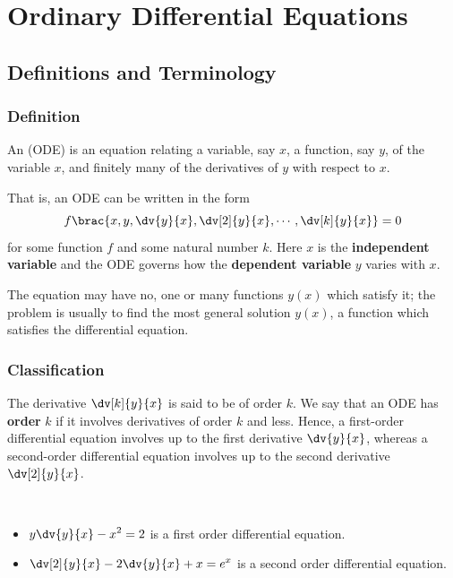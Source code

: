 

\chapter{Ordinary Differential Equations}

\section{Definitions and Terminology}
\subsection{Definition}
\begin{definition}
An  (ODE) is an equation relating a variable, say $x$, a function, say $y$, of the variable $x$, and finitely many of the derivatives of $y$ with respect to $x$.

That is, an ODE can be written in the form
\[ f\brac{x,y,\dv{y}{x},\dv[2]{y}{x},\cdots,\dv[k]{y}{x}} = 0 \]
for some function $f$ and some natural number $k$. Here $x$ is the \textbf{independent variable} and the ODE governs how the \textbf{dependent variable} $y$ varies with $x$. 
\end{definition}

\begin{remark}
The equation may have no, one or many functions $y(x)$ which satisfy it; the problem is usually to find the most general solution $y(x)$, a function which satisfies the differential equation.
\end{remark}

\subsection{Classification}
The derivative $\dv[k]{y}{x}$ is said to be of order $k$. We say that an ODE has \textbf{order} $k$ if it involves derivatives of order $k$ and less. Hence, a first-order differential equation involves up to the first derivative $\dv{y}{x}$, whereas a second-order differential equation involves up to the second derivative $\dv[2]{y}{x}$.
\begin{example} \
\begin{itemize}
\item $\displaystyle y\dv{y}{x}-x^2=2$ is a first order differential equation.
\item $\displaystyle\dv[2]{y}{x}-2\dv{y}{x}+x=e^x$ is a second order differential equation.
\end{itemize}
\end{example}

